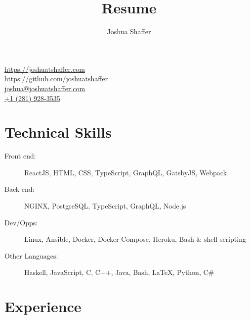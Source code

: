 \documentclass{resume}
\title{Resume}
\author{Joshua Shaffer}
\begin{document}
{\Huge\bfseries\theauthor}
\hfill
\begin{contactInfo}
    \href{https://joshuatshaffer.com}{https://joshuatshaffer.com} \\
    \href{https://github.com/joshuatshaffer}{https://github.com/joshuatshaffer} \\
    \href{mailto:joshua@joshuatshaffer.com}{joshua@joshuatshaffer.com} \\
    \href{tel:+12819283535}{+1 (281) 928-3535}
\end{contactInfo}

\section{Technical Skills}

\begin{description}
    \item[Front end:] ReactJS, HTML, CSS, TypeScript, GraphQL, GatsbyJS, Webpack
    \item[Back end:] NGINX, PostgreSQL, TypeScript, GraphQL, Node.js
    \item[Dev/Opps:] Linux, Ansible, Docker, Docker Compose, Heroku, Bash \& shell scripting
    \item[Other Languages:] Haskell, JavaScript, C, C++, Java, Bash, \LaTeX, Python, C\#
\end{description}

\section{Experience}

 \\
\end{document}

